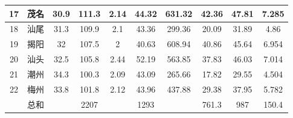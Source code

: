 \documentclass[UTF8,12pt]{ctexart}
\begin{document}
\begin{table}[H]
\begin{tabular}{cccccccccc}
        \midrule
        17 & 茂名  & 30.9  & 111.3    & 2.14  & 44.32    & 631.32 & 42.36    & 47.81 & 7.285 \\
        \midrule
        18 & 汕尾  & 31.3  & 109.9    & 2.1   & 43.36    & 299.36 & 20.09    & 31.89 & 4.86  \\
        \midrule
        19 & 揭阳  & 32    & 107.5    & 2     & 40.63    & 608.94 & 40.86    & 45.64 & 6.954 \\
        \midrule
        20 & 汕头  & 32.5  & 105.8    & 2.44  & 52.19    & 563.85 & 37.83    & 46.03 & 7.014 \\
        \midrule
        21 & 潮州  & 34.3  & 100.3    & 2.09  & 43.09    & 265.66 & 17.82    & 29.55 & 4.504 \\
        \midrule
        22 & 梅州  & 33.8  & 101.8    & 2.12  & 43.96    & 437.88 & 29.38    & 37.95 & 5.782 \\
        \midrule
           & 总和  &       & 2207     &       & 1293     &        & 761.3    & 987   & 150.4 \\
        \bottomrule
    \end{tabular}%
\end{table}%
\end{document}

